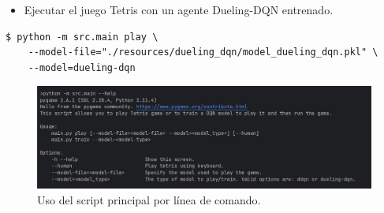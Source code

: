 \begin{itemize}
    \item Ejecutar el juego Tetris con un agente Dueling-DQN entrenado.
\end{itemize}
\begin{verbatim}
$ python -m src.main play \
    --model-file="./resources/dueling_dqn/model_dueling_dqn.pkl" \
    --model=dueling-dqn
\end{verbatim}

\begin{figure}[htbp]
	\centering
	\includegraphics[width=\textwidth]{./Figures/command.png}
	\caption{Uso del script principal por línea de comando.}
	\label{fig:command}
\end{figure}